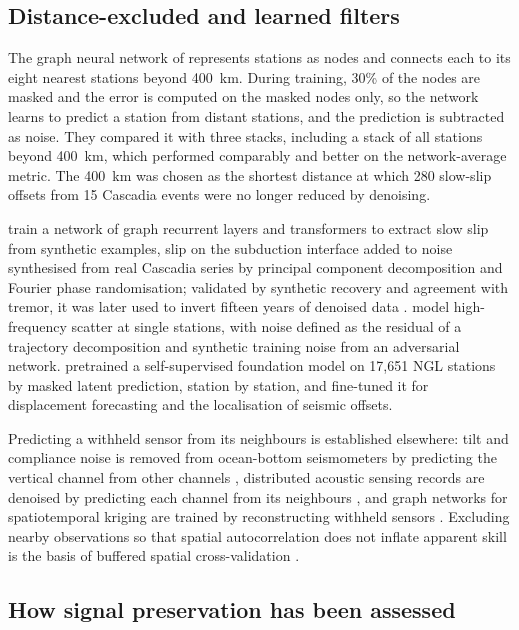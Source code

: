 \subsection{Distance-excluded and learned filters}

The graph neural network of \citet{bachelot2025} represents stations as nodes and connects each to its eight nearest stations beyond 400~km. During training, 30\% of the nodes are masked and the error is computed on the masked nodes only, so the network learns to predict a station from distant stations, and the prediction is subtracted as noise. They compared it with three stacks, including a stack of all stations beyond 400~km, which performed comparably and better on the network-average metric. The 400~km was chosen as the shortest distance at which 280 slow-slip offsets from 15 Cascadia events were no longer reduced by denoising.

\citet{costantino2024} train a network of graph recurrent layers and transformers to extract slow slip from synthetic examples, slip on the subduction interface added to noise synthesised from real Cascadia series by principal component decomposition and Fourier phase randomisation; validated by synthetic recovery and agreement with tremor, it was later used to invert fifteen years of denoised data \citep{costantino2026}. \citet{mastella2025} model high-frequency scatter at single stations, with noise defined as the residual of a trajectory decomposition \citep{bedfordbevis2018} and synthetic training noise from an adversarial network. \citet{teutschmann2026} pretrained a self-supervised foundation model on 17,651 NGL stations by masked latent prediction, station by station, and fine-tuned it for displacement forecasting and the localisation of seismic offsets.

Predicting a withheld sensor from its neighbours is established elsewhere: tilt and compliance noise is removed from ocean-bottom seismometers by predicting the vertical channel from other channels \citep{crawfordwebb2000, janiszewski2019}, distributed acoustic sensing records are denoised by predicting each channel from its neighbours \citep{batson2019, vandenende2023}, and graph networks for spatiotemporal kriging are trained by reconstructing withheld sensors \citep{wu2021ignnk, cini2022grin, marisca2022spin}. Excluding nearby observations so that spatial autocorrelation does not inflate apparent skill is the basis of buffered spatial cross-validation \citep{lerest2014}.

\subsection{How signal preservation has been assessed}

